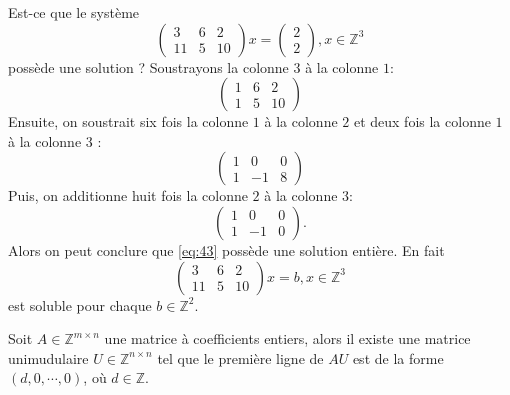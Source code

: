 \begin{example}
  \label{exe:28}
  Est-ce que le système
  \begin{equation}
    \label{eq:43}
     \begin{pmatrix}
      3 & 6 & 2 \\
      11 & 5 & 10
    \end{pmatrix} x =
    \begin{pmatrix}
      2 \\ 2
    \end{pmatrix}, x ∈ℤ^3
      \end{equation}
  possède une solution ?
  Soustrayons la colonne $3$ à la colonne $1$:
  \begin{displaymath}
     \begin{pmatrix}
      1 & 6 & 2 \\
      1 & 5 & 10
    \end{pmatrix}
  \end{displaymath}
  Ensuite, on soustrait six fois la colonne $1$ à la colonne $2$ et deux fois la colonne $1$ à la colonne $3$ :
 \begin{displaymath}
     \begin{pmatrix}
      1 & 0 & 0 \\
      1 & -1 & 8
    \end{pmatrix}
  \end{displaymath}
  Puis, on additionne huit fois la colonne $2$ à la colonne $3$:
  \begin{displaymath}
  \begin{pmatrix}
      1 & 0 & 0 \\
      1 & -1 & 0
    \end{pmatrix}. 
  \end{displaymath}      
    Alors on peut conclure que \eqref{eq:43} possède une solution entière. En fait
    \begin{displaymath}
    \label{eq:43}
     \begin{pmatrix}
      3 & 6 & 2 \\
      11 & 5 & 10
    \end{pmatrix} x =
    b, x ∈ℤ^3
  \end{displaymath} est soluble pour chaque $b ∈ℤ^2$. 
\end{example}


\begin{lemma}
  \label{lem:24}
  Soit  $A ∈ℤ^{ m ×n}$ une matrice à coefficients entiers, alors il existe une matrice unimudulaire $U ∈ℤ^{ n ×n}$ tel que le première ligne de $AU$ est de la forme $(d,0,\cdots,0)$, où $d ∈ℤ$.
\end{lemma}

